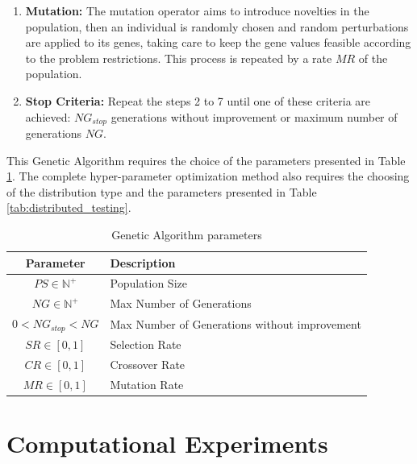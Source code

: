 \begin{enumerate}
    \item \textbf{Mutation:} The mutation operator aims to introduce novelties in the population, then an individual is randomly chosen and random perturbations are applied to its genes, taking care to keep the gene values feasible according to the problem restrictions. This process is repeated by a rate $MR$ of the population.

    \item \textbf{Stop Criteria:} Repeat the steps 2 to 7 until one of these criteria are achieved: $NG_{stop}$ generations without improvement or maximum number of generations $NG$.
\end{enumerate}

This Genetic Algorithm requires the choice of the  parameters presented in Table \ref{tab:genetic_algoritm}. The complete hyper-parameter optimization method also requires the choosing of the distribution type and the parameters presented in Table \ref{tab:distributed_testing}.

\begin{table}[htb]
    \centering
    \begin{tabular}{|c|p{7cm}|} \hline
        \textbf{Parameter} & \textbf{Description}  \\ \hline
         $PS \in \mathbb{N}^+$ & Population Size \\ \hline
         $NG \in \mathbb{N}^+$ & Max Number of Generations \\ \hline 
         $0 < NG_{stop} < NG$ & Max Number of Generations without improvement \\ \hline 
         $SR \in [0,1]$ & Selection Rate \\ \hline 
         $CR \in [0,1]$ & Crossover Rate \\ \hline 
         $MR \in [0,1]$ & Mutation Rate \\ \hline 
    \end{tabular}
    \caption{Genetic Algorithm parameters}
    \label{tab:genetic_algoritm}
\end{table}


\section{Computational Experiments}
\label{sec:scalability_experiments}

